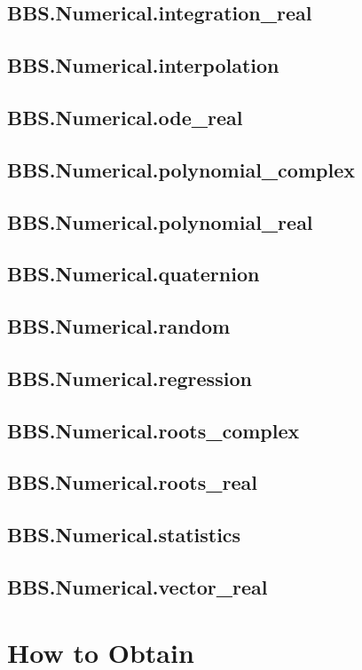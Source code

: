 \documentclass[10pt, openany]{book}
\begin{document}
\section{BBS.Numerical.integration\_real}
\section{BBS.Numerical.interpolation}
\section{BBS.Numerical.ode\_real}
\section{BBS.Numerical.polynomial\_complex}
\section{BBS.Numerical.polynomial\_real}
\section{BBS.Numerical.quaternion}
\section{BBS.Numerical.random}
\section{BBS.Numerical.regression}
\section{BBS.Numerical.roots\_complex}
\section{BBS.Numerical.roots\_real}
\section{BBS.Numerical.statistics}
\section{BBS.Numerical.vector\_real}

\chapter{How to Obtain}
\end{document}
